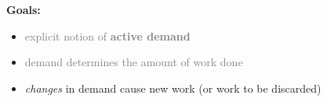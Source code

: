 \vspace{10pt}
\textbf{Goals:}
\begin{itemize}
\item \textcolor{gray}{explicit notion of \textbf{active demand}}
\item \textcolor{gray}{demand determines the amount of work done}
\item \emph{changes} in demand cause new work (or work to be discarded)
\end{itemize}
